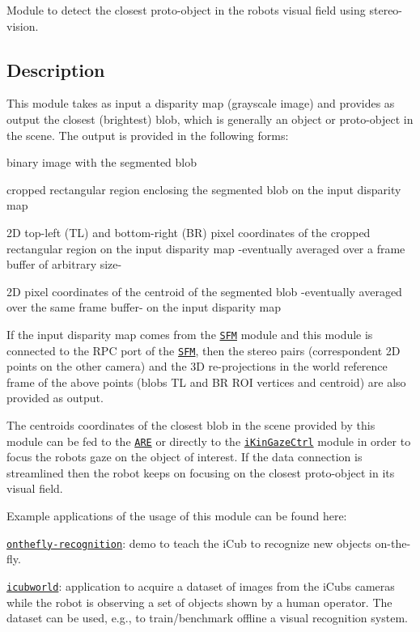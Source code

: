Module to detect the closest proto-\/object in the robot\textquotesingle{}s visual field using stereo-\/vision.

\subsection*{Description}

This module takes as input a disparity map (grayscale image) and provides as output the closest (brightest) blob, which is generally an object or proto-\/object in the scene. The output is provided in the following forms\+:


\begin{DoxyItemize}
\item binary image with the segmented blob
\item cropped rectangular region enclosing the segmented blob on the input disparity map
\item 2D top-\/left (TL) and bottom-\/right (BR) pixel coordinates of the cropped rectangular region on the input disparity map -\/eventually averaged over a frame buffer of arbitrary size-\/
\item 2D pixel coordinates of the centroid of the segmented blob -\/eventually averaged over the same frame buffer-\/ on the input disparity map
\end{DoxyItemize}

If the input disparity map comes from the \href{https://github.com/robotology/stereo-vision}{\tt S\+FM} module and this module is connected to the R\+PC port of the \href{https://github.com/robotology/stereo-vision}{\tt S\+FM}, then the stereo pairs (correspondent 2D points on the other camera) and the 3D re-\/projections in the world reference frame of the above points (blob\textquotesingle{}s TL and BR R\+OI vertices and centroid) are also provided as output.

The centroid\textquotesingle{}s coordinates of the closest blob in the scene provided by this module can be fed to the \href{http://wiki.icub.org/iCub_documentation/group__actionsRenderingEngine.html}{\tt A\+RE} or directly to the \href{http://wiki.icub.org/iCub_documentation/group__iKinGazeCtrl.html}{\tt i\+Kin\+Gaze\+Ctrl} module in order to focus the robot\textquotesingle{}s gaze on the object of interest. If the data connection is streamlined then the robot keeps on focusing on the closest proto-\/object in its visual field.

Example applications of the usage of this module can be found here\+:
\begin{DoxyItemize}
\item \href{https://github.com/robotology/onthefly-recognition}{\tt onthefly-\/recognition}\+: demo to teach the i\+Cub to recognize new objects on-\/the-\/fly.
\item \href{https://github.com/GiuliaP/icubworld}{\tt icubworld}\+: application to acquire a dataset of images from the i\+Cub\textquotesingle{}s cameras while the robot is observing a set of objects shown by a human operator. The dataset can be used, e.\+g., to train/benchmark offline a visual recognition system. 
\end{DoxyItemize}